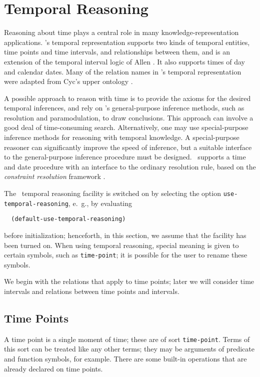 \section{Temporal Reasoning}
\label{sec-temporal-reasoning}

Reasoning about time plays a central role in many knowledge-representation
applications.  \snark's temporal representation supports two kinds of
temporal entities, time points and time intervals, and relationships
between them, and is an extension of the temporal interval logic of Allen
\cite{allen}.  It also supports times of day and calendar dates. Many of the
relation names in \snark's temporal representation were adapted from Cyc's
upper ontology \cite{cyc-ul}.

A possible approach to reason with time is to provide the axioms for the
desired temporal inferences, and rely on \snark\/'s general-purpose inference
methods, such as resolution and paramodulation, to draw conclusions.  This
approach can involve a good deal of time-consuming search.  Alternatively,
one may use special-purpose inference methods for reasoning with temporal
knowledge.  A special-purpose reasoner can significantly improve
the speed of inference, but a suitable interface to the general-purpose
inference procedure must be designed.  \Snark\  supports a time and date
procedure with an interface to the ordinary resolution rule, based on the
{\em constraint resolution} framework \cite{burckert}.

The \snark\    temporal reasoning facility is switched on by selecting the
option \verb'use-temporal-reasoning', e.\  g., by evaluating
\begin{verbatim}
  (default-use-temporal-reasoning)
\end{verbatim}
before initialization; henceforth, in this section, we assume that the
facility has been turned on.  When using temporal reasoning, special meaning
is given to certain symbols, such as {\tt time-point}; it is possible for
the user to rename these symbols.

We begin with the relations that apply to time points; later we will consider
time intervals and relations between time points and intervals.

\subsection{Time Points}

A time point is a single moment of time; these are of sort
\verb'time-point'.  Terms of this sort can be treated like any other terms;
they may be arguments of predicate and function symbols, for example.  There
are some built-in operations that are already declared on time points.

